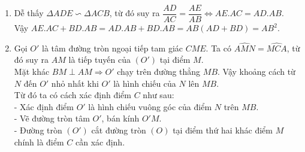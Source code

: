 \begin{ex}
{\begin{enumerate}
{
}
         \item Dễ thấy $\Delta ADE \backsim \Delta ACB$, từ đó suy ra $\dfrac{AD}{AC}=\dfrac{AE}{AB} \Leftrightarrow AE.AC=AD.AB$.\\
             Vậy $AE.AC+BD.AB=AD.AB+BD.AB=AB(AD+BD)=AB^2$.
         \item Gọi $O'$ là tâm đường tròn ngoại tiếp tam giác $CME$. Ta có $\widehat{AMN}=\widehat{MCA}$, từ đó suy ra $AM$ là tiếp tuyến của $(O')$ tại điểm $M$.\\
             Mặt khác $BM\perp AM \Rightarrow O'$ chạy trên đường thẳng $MB$. Vậy khoảng cách từ $N$ đến $O'$ nhỏ nhất khi $O'$ là hình chiếu của $N$ lên $MB.$\\
             Từ đó ta có cách xác định điểm $C$ như sau:\\
             - Xác định điểm $O'$ là hình chiếu vuông góc của điểm $N$ trên $MB$.\\
             - Vẽ đường tròn tâm $O'$, bán kính $O'M$.\\
             - Đường tròn $(O')$ cắt đường tròn $(O)$ tại điểm thứ hai khác điểm $M$ chính là điểm $C$ cần xác định.
     \end{enumerate}}
\end{ex}

